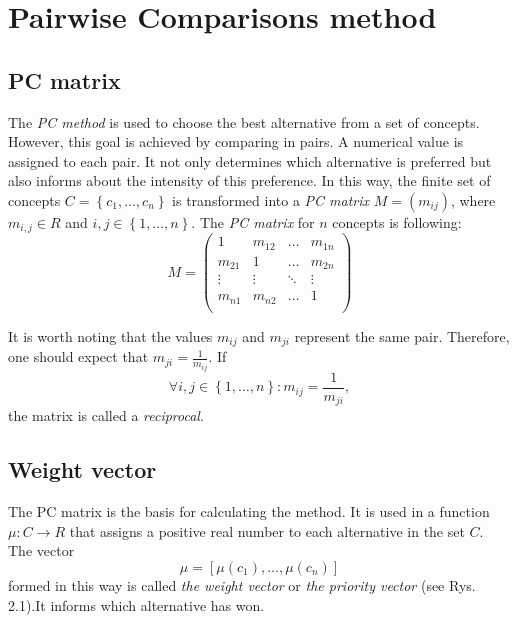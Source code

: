 \chapter{Pairwise Comparisons method}
\label{sec:pcMethod}
  \section{PC matrix}
	\label{subsec:macierzPC}
	
	The \textit{PC method} is used to choose the best alternative from a set of concepts. However, this goal is achieved by comparing in pairs. A numerical value is assigned to each pair. It not only determines which alternative is preferred but also informs about the intensity of this preference. In this way, the finite set of concepts $C=\left\{ c_{1},\ldots,c_{n}\right\} $ is transformed into a \textit{PC matrix} $M=\left(m_{ij}\right)$, where $m_{i,j}\in R$ and $i,j\in\left\{ 1,\ldots,n\right\}$. The \textit{PC matrix} for $n$ concepts is following:
$$
M = 
\left(
\begin{array}{lllll}
	1 & m_{12} & \dots & m_{1n}\\
	m_{21} & 1 & \dots & m_{2n}\\
	\vdots & \vdots & \ddots & \vdots\\
	m_{n1} & m_{n2} & \dots & 1\\ 	
\end{array}
\right)
$$

	It is worth noting that the values $m_{ij}$ and $m_{ji}$ represent the same pair. Therefore, one should expect that $m_{ji}=\frac{1}{m_{ij}}$. If
	\begin{equation} 
		\forall i,j\in\left\{ 1,\ldots,n\right\} :m_{ij}=\frac{1}{m_{ji}},
	\end{equation}
		the matrix is called a \textit{reciprocal}.

  \section{Weight vector}
	\label{subsec:wektorWag}
	
	The PC matrix is the basis for calculating the method. It is used in a function $\mu:C\rightarrow R$ that assigns a positive real number to each alternative in the set $C$. The vector $$\mu=\left[\mu\left(c_{1}\right),\ldots,\mu\left(c_{n}\right)\right]$$ formed in this way is called \textit{the weight vector} or \textit{the priority vector} (see Rys. 2.1).It informs which alternative has won.

